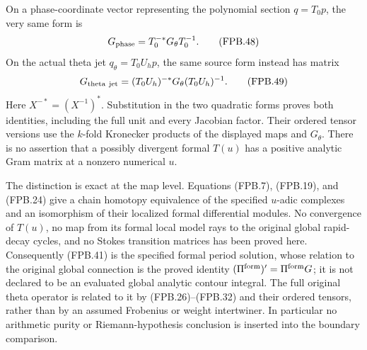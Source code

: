 On a phase-coordinate vector representing the polynomial section
\(q=T_0p\), the very same form is
\[
 G_{\rm phase}=T_0^{-*}G_\theta T_0^{-1}.
 \tag{FPB.48}\label{eq:fpb-pulled-metric}
\]
On the actual theta jet \(q_\theta=T_0U_hp\), the same source
form instead has matrix
\[
 G_{\rm theta\ jet}=(T_0U_h)^{-*}G_\theta(T_0U_h)^{-1}.
 \tag{FPB.49}\label{eq:fpb-theta-jet-metric}
\]
Here \(X^{-*}=(X^{-1})^*\). Substitution in the two quadratic
forms proves both identities, including the full unit and every
Jacobian factor. Their ordered tensor versions use the \(k\)-fold
Kronecker products of the displayed maps and \(G_\theta\).
There is no assertion that a possibly divergent formal \(T(u)\)
has a positive analytic Gram matrix at a nonzero numerical \(u\).

The distinction is exact at the map level. Equations (FPB.7),
(FPB.19), and (FPB.24) give a chain homotopy equivalence of the
specified \(u\)-adic complexes and an isomorphism of their localized
formal differential modules. No convergence of \(T(u)\), no map
from its formal local model rays to the original global rapid-decay
cycles, and no Stokes transition matrices has been proved here.
Consequently (FPB.41) is the specified formal period solution, whose
relation to the original global connection is the proved identity
\((\Pi^{\rm form})'=\Pi^{\rm form}G\); it is not declared to be
an evaluated global analytic contour integral. The full original
theta operator is related to it by (FPB.26)--(FPB.32) and their
ordered tensors, rather than by an assumed Frobenius or weight
intertwiner. In particular no arithmetic purity or Riemann-hypothesis
conclusion is inserted into the boundary comparison.

